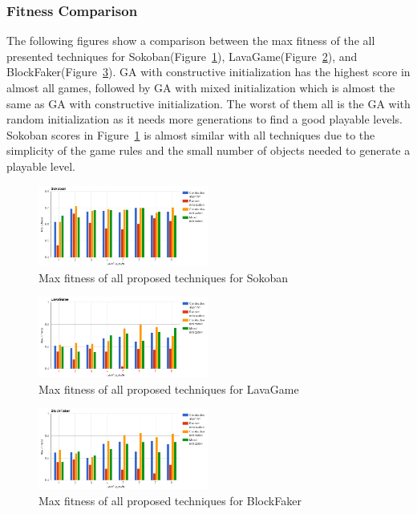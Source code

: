 \documentclass[letterpaper]{article}
\newcommand{\figref}[1]{Figure~\ref{Figure:#1}}
\begin{document}
\subsubsection{Fitness Comparison}
The following figures show a comparison between the max fitness of the all presented techniques for Sokoban(\figref{sokobanComparison}), LavaGame(\figref{lavaGameComparisonmparison}), and BlockFaker(\figref{blockFakerComparison}). GA with constructive initialization has the highest score in almost all games, followed by GA with mixed initialization which is almost the same as GA with constructive initialization. The worst of them all is the GA with random initialization as it needs more generations to find a good playable levels. Sokoban scores in \figref{sokobanComparison} is almost similar with all techniques due to the simplicity of the game rules and the small number of objects needed to generate a playable level.

\begin{figure}
  	\centering
    \includegraphics[width=0.5\textwidth]{Images/sokobanComparison}
    \caption{Max fitness of all proposed techniques for Sokoban}
    \label{Figure:sokobanComparison}
\end{figure}

\begin{figure}
  	\centering
    \includegraphics[width=0.5\textwidth]{Images/lavaGameComparison}
    \caption{Max fitness of all proposed techniques for LavaGame}
    \label{Figure:lavaGameComparisonmparison}
\end{figure}

\begin{figure}
  	\centering
    \includegraphics[width=0.5\textwidth]{Images/blockFakerComparison}
    \caption{Max fitness of all proposed techniques for BlockFaker}
    \label{Figure:blockFakerComparison}
\end{figure}
\end{document}
